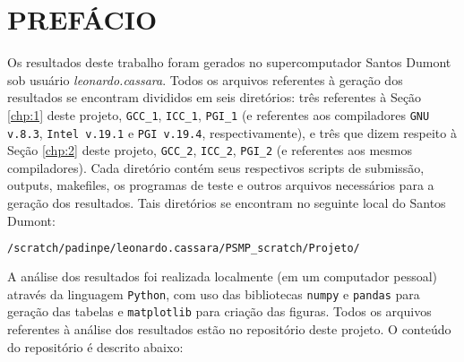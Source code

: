 
\chapter*{PREFÁCIO}

Os resultados deste trabalho foram gerados no supercomputador Santos Dumont sob usuário \textit{leonardo.cassara}. Todos os arquivos referentes à geração dos resultados se encontram divididos em seis diretórios: três referentes à Seção \ref{chp:1} deste projeto, \texttt{GCC\_1}, \texttt{ICC\_1}, \texttt{PGI\_1} (e referentes aos compiladores \texttt{GNU v.8.3}, \texttt{Intel v.19.1} e \texttt{PGI v.19.4}, respectivamente), e três que dizem respeito à Seção \ref{chp:2} deste projeto, \texttt{GCC\_2}, \texttt{ICC\_2}, \texttt{PGI\_2} (e referentes aos mesmos compiladores). Cada diretório contém seus respectivos scripts de submissão, outputs, makefiles, os programas de teste e outros arquivos necessários para a geração dos resultados. Tais diretórios se encontram no seguinte local do Santos Dumont:
\begin{lstlisting}[language=bash,style=mystyle2]
/scratch/padinpe/leonardo.cassara/PSMP_scratch/Projeto/
\end{lstlisting}

A análise dos resultados foi realizada localmente (em um computador pessoal) através da linguagem \texttt{Python}, com uso das bibliotecas \texttt{numpy} e \texttt{pandas} para geração das tabelas e \texttt{matplotlib} para criação das figuras. Todos os arquivos referentes à análise dos resultados estão no repositório deste projeto. O conteúdo do repositório é descrito abaixo:

